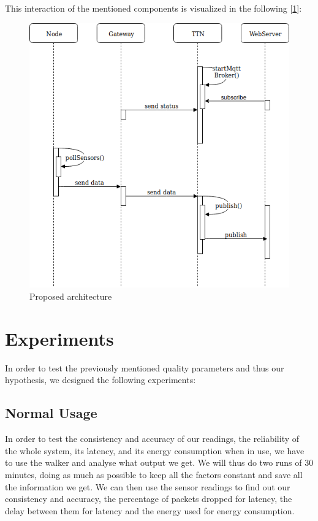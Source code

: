 	\newpage
	This interaction of the mentioned components is visualized in the following [\ref{fig:sequenceDiagram}]: 
	\begin{figure}[h!]
		\centering
		\includegraphics[width=0.9\linewidth]{gfx/sequenceDiagram.png}
		\caption{Proposed architecture}
		\label{fig:sequenceDiagram}
	\end{figure}
	
	
\section{Experiments}
	In order to test the previously mentioned quality parameters and thus our hypothesis, we designed the following experiments:

	\subsection{Normal Usage}
		In order to test the consistency and accuracy of our readings, the reliability of the whole system, its latency, and its energy consumption when in use, we have to use the walker and analyse what output we get. We will thus do two runs of 30 minutes, doing as much as possible to keep all the factors constant and save all the information we get. We can then use the sensor readings to find out our consistency and accuracy, the percentage of packets dropped for latency, the delay between them for latency and the energy used for energy consumption.

